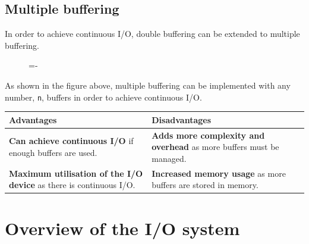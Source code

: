\documentclass[a4paper]{systems-software}
\begin{document}
\subsection*{Multiple buffering}

In order to achieve continuous I/O, double buffering can be extended to multiple buffering.

\begin{figure}[H]
  \lineskip=-\fboxrule
\end{figure}

As shown in the figure above, multiple buffering can be implemented with any number, \texttt{n}, buffers in order to achieve continuous I/O.

\begin{longtabu} to \textwidth {| X[1,l] | X[1,l] |}
    \hline
    \textbf{Advantages} & \textbf{Disadvantages}
	\\ \hline
	\textbf{Can achieve continuous I/O} if enough buffers are used. &
	\textbf{Adds more complexity and overhead} as more buffers must be managed.
	\\ \hline
	\textbf{Maximum utilisation of the I/O device} as there is continuous I/O. &
	\textbf{Increased memory usage} as more buffers are stored in memory.
	\\ \hline
\end{longtabu}


\newpage

\section*{Overview of the I/O system}
\end{document}
